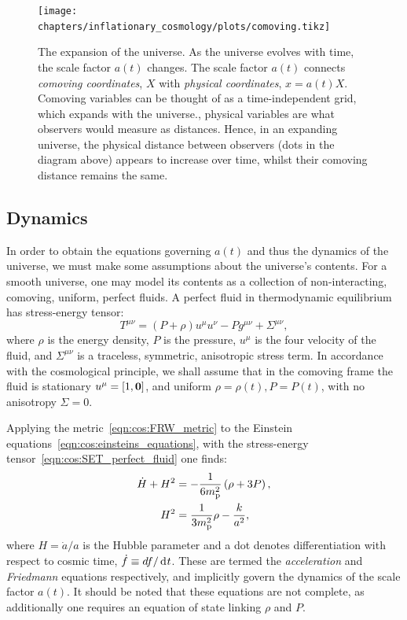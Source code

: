 \begin{figure}[tp]
  \centering
  \texttt{[image: chapters/inflationary\_cosmology/plots/comoving.tikz]}
  \caption{The expansion of the universe. As the universe evolves with time, the scale factor $a(t)$ changes. The scale factor $a(t)$ connects {\em comoving coordinates}, $X$ with {\em physical coordinates}, $x=a(t)X$. Comoving variables can be thought of as a time-independent grid, which expands with the universe.\label{fig:cos:comoving_vs_physical}, physical variables are what observers would measure as distances. Hence, in an expanding universe, the physical distance between observers (dots in the diagram above) appears to increase over time, whilst their comoving distance remains the same.}
\end{figure}


\subsection{Dynamics}
In order to obtain the equations governing $a(t)$ and thus the dynamics of the universe, we must make some assumptions about the universe's contents. For a smooth universe, one may model its contents as a collection of non-interacting, comoving, uniform, perfect fluids. A perfect fluid in thermodynamic equilibrium has stress-energy tensor:
\begin{equation}
  T^{\mu\nu} = (P+\rho)u^{\mu}u^{\nu} - P g^{\mu\nu} + \Sigma^{\mu\nu},
  \label{eqn:cos:SET_perfect_fluid}
\end{equation}
where $\rho$ is the energy density, $P$ is the pressure, $u^\mu$ is the four velocity of the fluid, and $\Sigma^{\mu\nu}$ is a traceless, symmetric, anisotropic stress term. In accordance with the cosmological principle, we shall assume that in the comoving frame the fluid is stationary $u^\mu = [1,\mathbf{0}]$, and uniform $\rho=\rho(t),P=P(t)$, with no anisotropy $\Sigma=0$.  

Applying the metric~\eqref{eqn:cos:FRW_metric} to the Einstein equations~\eqref{eqn:cos:einsteins_equations}, with the stress-energy tensor~\eqref{eqn:cos:SET_perfect_fluid} one finds:
\begin{align}
  \dot{H}+H^2 &= 
  -\frac{1}{6m_{\mathrm{p}}^2}\left( \rho + 3P\right), 
  \label{eqn:cos:Raychaudhuri}
  \\
  H^2 &= 
  \frac{1}{3m_{\mathrm{p}}^2}\rho - \frac{k}{a^2}, 
  \label{eqn:cos:Friedmann}
\end{align}
%
where $H=\dot{a}/a$ is the Hubble parameter and a dot denotes differentiation with respect to cosmic time, $\dot{f}\equiv df/\operatorname{d}^{}\!{t}$. These are termed the {\em acceleration\/} and {\em Friedmann\/} equations respectively, and implicitly govern the dynamics of the scale factor $a(t)$. It should be noted that these equations are not complete, as additionally one requires an equation of state linking $\rho$ and $P$.

